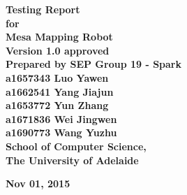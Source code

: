\documentclass[11pt, a4paper]{article}
\begin{document}
\begin{titlepage}

\begin{center}

	\vspace{0.5 cm}
	\fontsize{35}{35}\selectfont\bf {Testing Report}\\
	\vspace{0.5 cm}
	\huge{\bfseries for}\\
	\vspace{0.5 cm}
	\fontsize{35}{40}\selectfont\bf {Mesa Mapping Robot}\\
	
	\vspace{2cm}
	\Large\textbf{Version 1.0 approved}\\
	
	\vspace{1.5cm}
	\Large\textbf {Prepared by SEP Group 19 - Spark\\
								a1657343 Luo Yawen\\
								a1662541 Yang Jiajun\\
								a1653772 Yun Zhang\\
								a1671836 Wei Jingwen\\
								a1690773 Wang Yuzhu}\\
		
	\vspace{2cm}
	\Large\textbf{School of Computer Science,\\
								The University of Adelaide}\\
	\vspace{2cm}
	
	\Large\textbf{Nov 01, 2015}\\

\end{center}

\end{titlepage}

\tableofcontents

\vspace{1cm}
\end{document}
